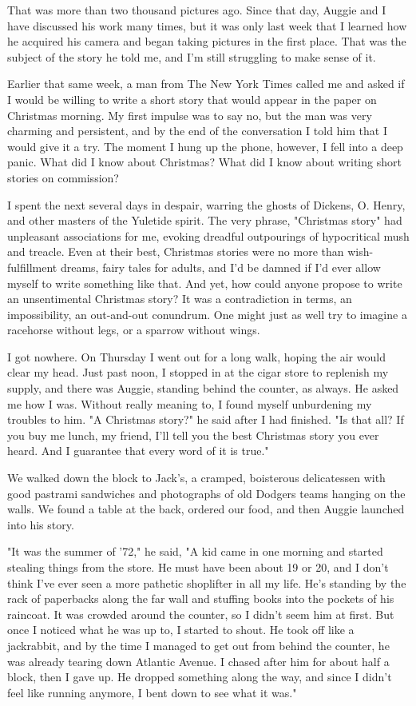 \documentclass[10pt,a4paper]{article}
\begin{document}
That was more than two thousand pictures ago. Since that day, Auggie and I have discussed his work many times, but it was only last week that I learned how he acquired his camera and began taking pictures in the first place. That was the subject of the story he told me, and I'm still struggling to make sense of it.

Earlier that same week, a man from The New York Times called me and asked if I would be willing to write a short story that would appear in the paper on Christmas morning. My first impulse was to say no, but the man was very charming and persistent, and by the end of the conversation I told him that I would give it a try. The moment I hung up the phone, however, I fell into a deep panic. What did I know about Christmas? What did I know about writing short stories on commission?

I spent the next several days in despair, warring the ghosts of Dickens, O. Henry, and other masters of the Yuletide spirit. The very phrase, "Christmas story" had unpleasant associations for me, evoking dreadful outpourings of hypocritical mush and treacle. Even at their best, Christmas stories were no more than wish-fulfillment dreams, fairy tales for adults, and I'd be damned if I'd ever allow myself to write something like that. And yet, how could anyone propose to write an unsentimental Christmas story? It was a contradiction in terms, an impossibility, an out-and-out conundrum. One might just as well try to imagine a racehorse without legs, or a sparrow without wings.

I got nowhere. On Thursday I went out for a long walk, hoping the air would clear my head. Just past noon, I stopped in at the cigar store to replenish my supply, and there was Auggie, standing behind the counter, as always. He asked me how I was. Without really meaning to, I found myself unburdening my troubles to him. "A Christmas story?" he said after I had finished. "Is that all? If you buy me lunch, my friend, I'll tell you the best Christmas story you ever heard. And I guarantee that every word of it is true."

We walked down the block to Jack's, a cramped, boisterous delicatessen with good pastrami sandwiches and photographs of old Dodgers teams hanging on the walls. We found a table at the back, ordered our food, and then Auggie launched into his story.

"It was the summer of '72," he said, "A kid came in one morning and started stealing things from the store. He must have been about 19 or 20, and I don't think I've ever seen a more pathetic shoplifter in all my life. He's standing by the rack of paperbacks along the far wall and stuffing books into the pockets of his raincoat. It was crowded around the counter, so I didn't seem him at first. But once I noticed what he was up to, I started to shout. He took off like a jackrabbit, and by the time I managed to get out from behind the counter, he was already tearing down Atlantic Avenue. I chased after him for about half a block, then I gave up. He dropped something along the way, and since I didn't feel like running anymore, I bent down to see what it was."
\end{document}

